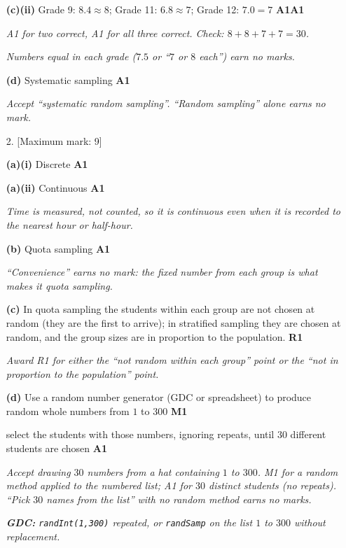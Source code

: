 \documentclass[12pt, twoside]{article}
\begin{document}
\begin{enumerate}[itemsep=0.3cm]
\textbf{(c)(ii)} Grade 9: $8.4 \approx 8$; \quad Grade 11: $6.8 \approx 7$;
\quad Grade 12: $7.0 = 7$ \hfill \textbf{A1A1}

\emph{A1 for two correct, A1 for all three correct. Check: $8 + 8 + 7 + 7 =
30$.}

\emph{Numbers equal in each grade ($7.5$ or ``$7$ or $8$ each'') earn no
marks.}

\textbf{(d)} Systematic sampling \hfill \textbf{A1}

\emph{Accept ``systematic random sampling''. ``Random sampling'' alone earns
no mark.}

\newpage

\item[2.] [Maximum mark: 9]

\textbf{(a)(i)} Discrete \hfill \textbf{A1}

\textbf{(a)(ii)} Continuous \hfill \textbf{A1}

\emph{Time is measured, not counted, so it is continuous even when it is
recorded to the nearest hour or half-hour.}

\textbf{(b)} Quota sampling \hfill \textbf{A1}

\emph{``Convenience'' earns no mark: the fixed number from each group is
what makes it quota sampling.}

\textbf{(c)} In quota sampling the students within each group are not
chosen at random (they are the first to arrive); in stratified sampling
they are chosen at random, and the group sizes are in proportion to the
population. \hfill \textbf{R1}

\emph{Award R1 for either the ``not random within each group'' point or the
``not in proportion to the population'' point.}

\textbf{(d)} Use a random number generator (GDC or spreadsheet) to produce
random whole numbers from $1$ to $300$ \hfill \textbf{M1}

select the students with those numbers, ignoring repeats, until $30$
different students are chosen \hfill \textbf{A1}

\emph{Accept drawing $30$ numbers from a hat containing $1$ to $300$. M1 for
a random method applied to the numbered list; A1 for $30$ distinct
students (no repeats). ``Pick $30$ names from the list'' with no random
method earns no marks.}

\emph{\textbf{GDC:} \texttt{randInt(1,300)} repeated, or
\texttt{randSamp} on the list $1$ to $300$ without replacement.}


\end{enumerate}
\end{document}
